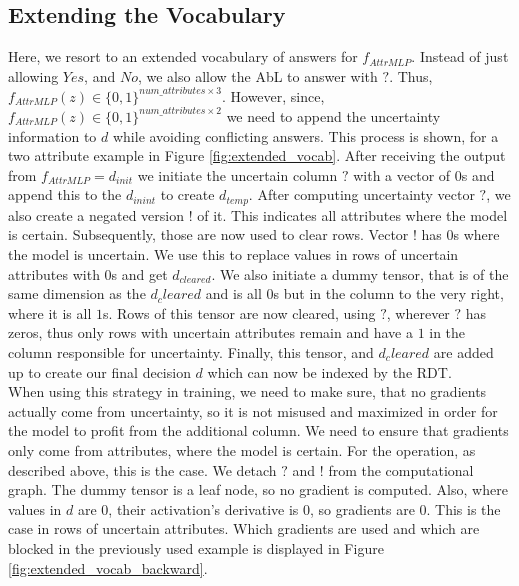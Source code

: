 \documentclass[a4paper,cleardoubleempty,BCOR1cm, 11pt]{report}
\begin{document}



\subsection{Extending the Vocabulary}
Here, we resort to an extended vocabulary of answers for $f_{AttrMLP}$. Instead of just allowing $Yes$, and $No$, we also allow the AbL to answer with $?$. Thus, $f_{AttrMLP}(z) \in \lbrace 0,1 \rbrace^{num\_attributes \times 3}$. However, since, $f_{AttrMLP}(z) \in \lbrace 0,1 \rbrace^{num\_attributes \times 2}$ we need to append the uncertainty information to $d$ while avoiding conflicting answers. This process is shown, for a two attribute example in Figure \ref{fig:extended_vocab}. After receiving the output from $f_{AttrMLP} = d_{init}$ we initiate the uncertain column $?$ with a vector of $0$s and append this to the $d_{inint}$ to create $d_{temp}$. After computing uncertainty vector $?$, we also create a negated version $!$ of it. This indicates all attributes where the model is certain. Subsequently, those are now used to clear rows. Vector $!$ has $0$s where the model is uncertain. We use this to replace values in rows of uncertain attributes with $0$s and get $d_{cleared}$. We also initiate a dummy tensor, that is of the same dimension as the $d_cleared$ and is all $0$s but in the column to the very right, where it is all $1$s. Rows of this tensor are now cleared, using $?$, wherever $?$ has zeros, thus only rows with uncertain attributes remain and have a $1$ in the column responsible for uncertainty. Finally, this tensor, and $d_cleared$ are added up to create our final decision $d$ which can now be indexed by the RDT.\\
When using this strategy in training, we need to make sure, that no gradients actually come from uncertainty, so it is not misused and maximized in order for the model to profit from the additional column. We need to ensure that gradients only come from attributes, where the model is certain. For the operation, as described above, this is the case. We detach $?$ and $!$ from the computational graph. The dummy tensor is a leaf node, so no gradient is computed. Also, where values  in $d$ are $0$, their activation's derivative is $0$, so gradients are $0$. This is the case in rows of uncertain attributes. Which gradients are used and which are blocked in the previously used example is displayed in Figure \ref{fig:extended_vocab_backward}.
\end{document}
